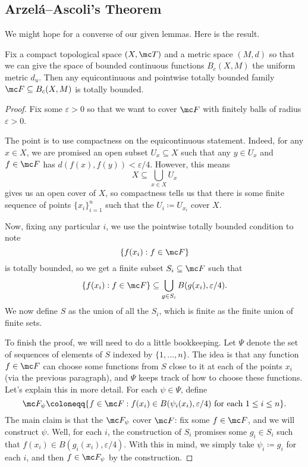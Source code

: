 \documentclass[../notes.tex]{subfiles}
\begin{document}
\subsection{Arzel\'a--Ascoli's Theorem}
We might hope for a converse of our given lemmas. Here is the result.
\begin{theorem} \label{thm:ascoli}
	Fix a compact
	 topological space $(X,\mc T)$ and a metric space $(M,d)$ so that we can give the space of bounded continuous functions $B_c(X,M)$ the uniform metric $d_u$. Then any equicontinuous and pointwise totally bounded family $\mc F\subseteq B_c(X,M)$ is totally bounded.
\end{theorem}
\begin{proof}
	Fix some $\varepsilon>0$ so that we want to cover $\mc F$ with finitely balls of radius $\varepsilon>0$.
	
	The point is to use compactness on the equicontinuous statement. Indeed, for any $x\in X$, we are promised an open subset $U_x\subseteq X$ such that any $y\in U_x$ and $f\in\mc F$ has $d(f(x),f(y))<\varepsilon/4$. However, this means
	\[X\subseteq\bigcup_{x\in X}U_x\]
	gives us an open cover of $X$, so compactness tells us that there is some finite sequence of points $\{x_i\}_{i=1}^n$ such that the $U_i\coloneqq U_{x_i}$ cover $X$.

	Now, fixing any particular $i$, we use the pointwise totally bounded condition to note
	\[\{f(x_i):f\in\mc F\}\]
	is totally bounded, so we get a finite subset $S_i\subseteq\mc F$ such that
	\[\{f(x_i):f\in\mc F\}\subseteq\bigcup_{g\in S_i}B(g(x_i),\varepsilon/4).\]
	We now define $S$ as the union of all the $S_i$, which is finite as the finite union of finite sets.

	To finish the proof, we will need to do a little bookkeeping. Let $\Psi$ denote the set of sequences of elements of $S$ indexed by $\{1,\ldots,n\}$. The idea is that any function $f\in\mc F$ can choose some functions from $S$ close to it at each of the points $x_i$ (via the previous paragraph), and $\Psi$ keeps track of how to choose these functions. Let's explain this in more detail. For each $\psi\in\Psi$, define 
	\[\mc F_\psi\coloneqq\{f\in\mc F:f(x_i)\in B(\psi_i(x_i),\varepsilon/4)\text{ for each }1\le i\le n\}.\]
	The main claim is that the $\mc F_\psi$ cover $\mc F$: fix some $f\in\mc F$, and we will construct $\psi$. Well, for each $i$, the construction of $S_i$ promises some $g_i\in S_i$ such that $f(x_i)\in B(g_i(x_i),\varepsilon/4)$. With this in mind, we simply take $\psi_i\coloneqq g_i$ for each $i$, and then $f\in\mc F_\psi$ by the construction.
	

\end{proof}
\end{document}
